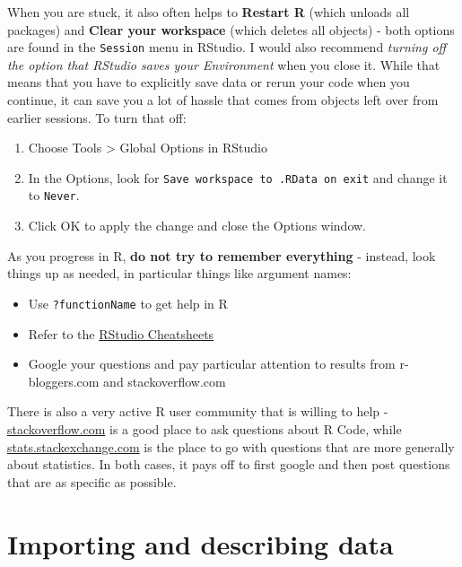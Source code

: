 \documentclass[
]{book}
\providecommand{\tightlist}{%
  \setlength{\itemsep}{0pt}\setlength{\parskip}{0pt}}
\begin{document}
When you are stuck, it also often helps to \textbf{Restart R} (which unloads all packages) and \textbf{Clear your workspace} (which deletes all objects) - both options are found in the \texttt{Session} menu in RStudio. I would also recommend \emph{turning off the option that RStudio saves your Environment} when you close it. While that means that you have to explicitly save data or rerun your code when you continue, it can save you a lot of hassle that comes from objects left over from earlier sessions. To turn that off:

\begin{enumerate}
\def\labelenumi{\arabic{enumi}.}
\tightlist
\item
  Choose Tools \textgreater{} Global Options in RStudio
\item
  In the Options, look for \texttt{Save\ workspace\ to\ .RData\ on\ exit} and change it to \texttt{Never}.
\item
  Click OK to apply the change and close the Options window.
\end{enumerate}

As you progress in R, \textbf{do not try to remember everything} - instead, look things up as needed, in particular things like argument names:

\begin{itemize}
\tightlist
\item
  Use \texttt{?functionName} to get help in R
\item
  Refer to the \href{https://rstudio.com/resources/cheatsheets/}{RStudio Cheatsheets}
\item
  Google your questions and pay particular attention to results from r-bloggers.com and stackoverflow.com
\end{itemize}

There is also a very active R user community that is willing to help - \href{https://stackoverflow.com/}{stackoverflow.com} is a good place to ask questions about R Code, while \href{https://stats.stackexchange.com}{stats.stackexchange.com} is the place to go with questions that are more generally about statistics. In both cases, it pays off to first google and then post questions that are as specific as possible.

\hypertarget{importing-and-describing-data}{%
\chapter{Importing and describing data}\label{importing-and-describing-data}}
\end{document}
